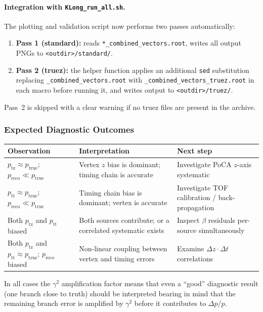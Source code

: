 \paragraph{Integration with \texttt{KLong\_run\_all.sh}.}
The plotting and validation script now performs two passes automatically:
\begin{enumerate}
  \item \textbf{Pass 1 (standard):} reads \texttt{*\_combined\_vectors.root},
        writes all output PNGs to \texttt{<outdir>/standard/}.
  \item \textbf{Pass 2 (truez):} the helper function applies an additional
        \texttt{sed} substitution replacing \texttt{\_combined\_vectors.root} with
        \texttt{\_combined\_vectors\_truez.root} in each macro before running it,
        and writes output to \texttt{<outdir>/truez/}.
\end{enumerate}
Pass~2 is skipped with a clear warning if no truez files are present in the archive.

\subsubsection{Expected Diagnostic Outcomes}

\begin{center}
\begin{tabular}{p{4cm}p{5cm}p{4cm}}
  \toprule
  Observation & Interpretation & Next step \\
  \midrule
  $p_{\text{tz}} \approx p_{\text{true}}$;\quad $p_{\text{reco}} \ll p_{\text{true}}$
    & Vertex $z$ bias is dominant; timing chain is accurate
    & Investigate PoCA $z$-axis systematic \\[6pt]
  $p_{\text{tt}} \approx p_{\text{true}}$;\quad $p_{\text{reco}} \ll p_{\text{true}}$
    & Timing chain bias is dominant; vertex is accurate
    & Investigate TOF calibration / back-propagation \\[6pt]
  Both $p_{\text{tz}}$ and $p_{\text{tt}}$ biased
    & Both sources contribute; or a correlated systematic exists
    & Inspect $\beta$ residuals per-source simultaneously \\[6pt]
  Both $p_{\text{tz}}$ and $p_{\text{tt}} \approx p_{\text{true}}$;\quad
  $p_{\text{reco}}$ biased
    & Non-linear coupling between vertex and timing errors
    & Examine $\Delta z \cdot \Delta t$ correlations \\
  \bottomrule
\end{tabular}
\end{center}

In all cases the $\gamma^2$ amplification factor means that even a ``good'' diagnostic
result (one branch close to truth) should be interpreted bearing in mind that the
remaining branch error is amplified by $\gamma^2$ before it contributes to
$\Delta p / p$.
